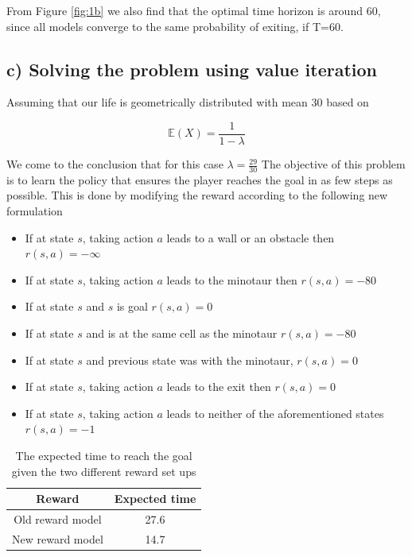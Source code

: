 \documentclass{article}
\begin{document}
From Figure \ref{fig:1b} we also find that the optimal time horizon is around 60, since all models converge to the same probability of exiting, if T=60.

\subsection{c) Solving the problem using value iteration}
Assuming that our life is geometrically distributed with mean 30 based on

\begin{equation}
    \mathbb{E}(X) = \frac{1}{1-\lambda}
\end{equation}

We come to the conclusion that for this case $ \lambda = \frac{29}{30} $
The objective of this problem is to learn the policy that ensures the player reaches the goal in as few steps as possible. This is done by modifying the reward according to the following new formulation

\begin{itemize}
    \item If at state $s$, taking action $a$ leads to a wall or an obstacle then $r(s,a) = -\infty$
    \item If at state $s$, taking action $a$ leads to the minotaur then $ r(s,a) = -80 $
    \item If at state $s$ and $s$ is goal $r(s,a)=0$ 
    \item If at state $s$ and is at the same cell as the minotaur $r(s,a)=-80$ 
    \item If at state $s$ and previous state was with the minotaur, $r(s,a)=0$
    \item If at state $s$, taking action $a$ leads to the exit then $ r(s,a) = 0 $
    \item If at state $s$, taking action $a$ leads to neither of the aforementioned states $ r(s,a) = -1 $
\end{itemize}



\begin{table}[h!]
    \centering
    \caption{The expected time to reach the goal given the two different reward set ups}
    \begin{tabular}{c|c}
    Reward & Expected time \\ \hline
    Old reward model &  27.6 \\
    New reward model & 14.7
    \end{tabular}
\end{table}
\end{document}

